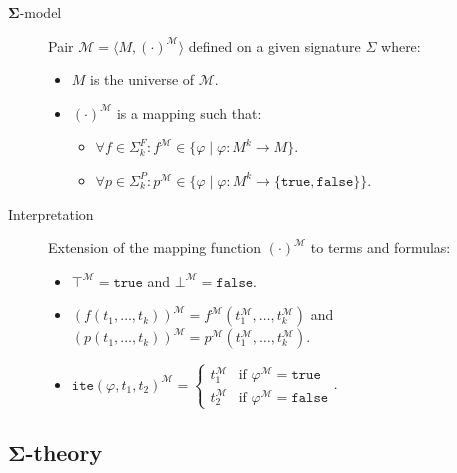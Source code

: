 \begin{description}
    \item[$\mathbf{\Sigma}$-model] 
        Pair $\mathcal{M} = \langle M, (\cdot)^\mathcal{M} \rangle$ defined on a given signature $\Sigma$ where:
        \begin{itemize}
            \item $M$ is the universe of $\mathcal{M}$.
            \item $(\cdot)^\mathcal{M}$ is a mapping such that:
            \begin{itemize}
                \item $\forall f \in \Sigma^F_k: f^\mathcal{M} \in \{ \varphi \mid \varphi: M^k \rightarrow M \}$.
                \item $\forall p \in \Sigma^P_k: p^\mathcal{M} \in \{ \varphi \mid \varphi: M^k \rightarrow \{ \texttt{true}, \texttt{false} \} \}$.
            \end{itemize}
        \end{itemize} 

    \item[Interpretation] 
        Extension of the mapping function $(\cdot)^\mathcal{M}$ to terms and formulas:
        \begin{itemize}
            \item $\top^\mathcal{M} = \texttt{true}$ and $\bot^\mathcal{M} = \texttt{false}$.
            \item $(f(t_1, \dots, t_k))^\mathcal{M} = f^\mathcal{M}(t_1^\mathcal{M}, \dots, t_k^\mathcal{M})$ and 
                $(p(t_1, \dots, t_k))^\mathcal{M} = p^\mathcal{M}(t_1^\mathcal{M}, \dots, t_k^\mathcal{M})$.
            \item $\texttt{ite}(\varphi, t_1, t_2)^\mathcal{M} = \begin{cases}
                    t_1^\mathcal{M} & \text{if $\varphi^\mathcal{M} = \texttt{true}$} \\
                    t_2^\mathcal{M} & \text{if $\varphi^\mathcal{M} = \texttt{false}$}
                \end{cases}$.
        \end{itemize}
\end{description}


\subsection{$\mathbf{\Sigma}$-theory}

